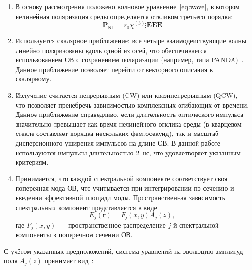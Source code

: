 \begin{enumerate}
	\item В основу рассмотрения положено волновое уравнение~\cref{eq:wave}, в котором нелинейная поляризация среды определяется откликом третьего порядка:
	\begin{equation*}
		\mathbf{P}_{\text{NL}} = \varepsilon_0 \chi^{(3)} \vdots \mathbf{EEE}
	\end{equation*}
	
	\item Используется скалярное приближение: все четыре взаимодействующие волны линейно поляризованы вдоль одной из осей, что обеспечивается использованием ОВ с сохранением поляризации (например, типа PANDA)~\cite{fud3562,fud3564}. Данное приближение позволяет перейти от векторного описания к скалярному.
	
	\item Излучение считается непрерывным (CW) или квазинепрерывным (QCW), что позволяет пренебречь зависимостью комплексных огибающих от времени. Данное приближение справедливо, если длительность оптического импульса значительно превышает как время нелинейного отклика среды (в кварцевом стекле составляет порядка нескольких фемтосекунд), так и масштаб дисперсионного уширения импульсов на длине ОВ. В данной работе используются импульсы длительностью 2~нс, что удовлетворяет указанным критериям.
	
	\item Принимается, что каждой спектральной компоненте соответствует своя поперечная мода ОВ, что учитывается при интегрировании по сечению и введении эффективной площади моды. Пространственная зависимость спектральных компонент представляется в виде
	\begin{equation*}
		E_j(\mathbf{r}) = F_j(x,y) A_j(z),
	\end{equation*}
	где $F_j(x,y)$~--- пространственное распределение $j$-й спектральной компоненты в поперечном сечении ОВ.
\end{enumerate}


С учётом указанных предположений, система уравнений на эволюцию амплитуд поля $A_j(z)$ принимает вид~\cite{agrawal2019}:

